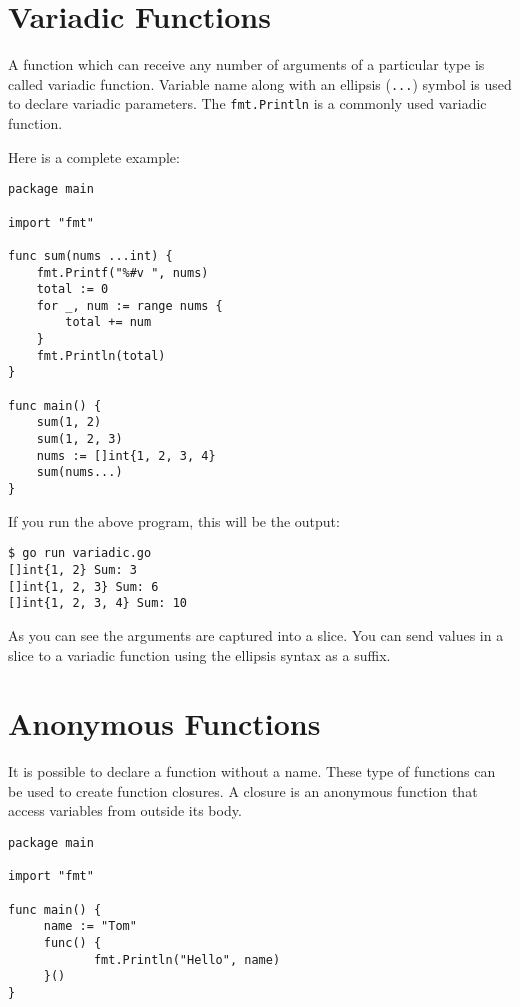 \section{Variadic Functions}

A function which can
receive any number of arguments of a particular type is called
variadic function.  Variable name along with an ellipsis
(\texttt{...}) symbol is used to declare variadic parameters.
The \texttt{fmt.Println} is a commonly used variadic function.

Here is a complete example:

\begin{lstlisting}[caption=Variadic Function (variadic.go)]
package main

import "fmt"

func sum(nums ...int) {
    fmt.Printf("%#v ", nums)
    total := 0
    for _, num := range nums {
        total += num
    }
    fmt.Println(total)
}

func main() {
    sum(1, 2)
    sum(1, 2, 3)
    nums := []int{1, 2, 3, 4}
    sum(nums...)
}
\end{lstlisting}

If you run the above program, this will be the output:

\begin{lstlisting}[numbers=none]
$ go run variadic.go
[]int{1, 2} Sum: 3
[]int{1, 2, 3} Sum: 6
[]int{1, 2, 3, 4} Sum: 10
\end{lstlisting}

As you can see the arguments are captured into a slice.  You can send
values in a slice to a variadic function using the ellipsis syntax as
a suffix.

\section{Anonymous Functions}

It is possible to declare a function without a
name.  These type of functions can be used
to create function closures.  A closure is an anonymous function that
access variables from outside its body.

\begin{lstlisting}[caption=Anonymous Function (anonfunc.go)]
package main

import "fmt"

func main() {
     name := "Tom"
     func() {
            fmt.Println("Hello", name)
     }()
}
\end{lstlisting}

